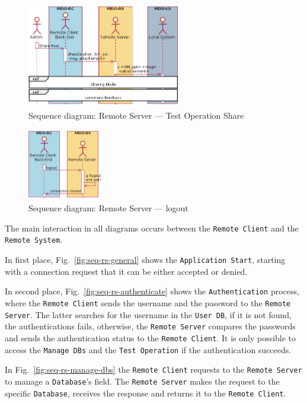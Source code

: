 \begin{figure}[htb!]
  \centering
  \includegraphics[width=0.6\textwidth]{img/seq-rs-test-op-sharing.png}%
  \caption{Sequence diagram: Remote Server --- Test Operation Share}%
  \label{fig:seq-rs-test-op-sharing}
\end{figure}

\begin{figure}[htb!]
  \centering
  \includegraphics[width=0.3\textwidth]{img/seq-rs-logout.png}%
  \caption{Sequence diagram: Remote Server --- logout}%
  \label{fig:seq-rs-logout}
\end{figure}

The main interaction in all diagrams occurs between the \texttt{Remote Client} and the \texttt{Remote System}.

In first place, Fig.~\ref{fig:seq-rs-general} shows the \texttt{Application Start}, starting with a connection request that it can be either accepted or denied.

In second place, Fig.~\ref{fig:seq-rs-authenticate} shows the \texttt{Authentication} process, where the \texttt{Remote Client} sends the username and the password to the \texttt{Remote Server}.
The latter searches for the username in the \texttt{User DB}, if it is not
found, the authentications fails, otherwise, the \texttt{Remote Server} compares
the passwords and sends the authentication status to the \texttt{Remote Client}.
It is only possible to access the \texttt{Manage DBs} and the \texttt{Test Operation} if the authentication succeeds.

In Fig.~\ref{fig:seq-rs-manage-dbs} the \texttt{Remote Client} requests to the
\texttt{Remote Server} to manage a \texttt{Database}'s field.
The \texttt{Remote Server} makes the request to the specific \texttt{Database},
receives the response and returns it to the \texttt{Remote Client}.


